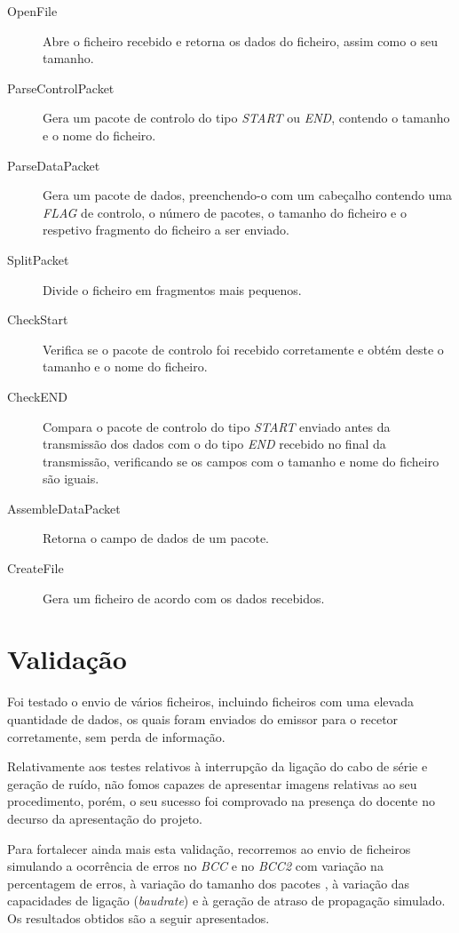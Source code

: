 \documentclass[11pt]{article}
\begin{document}
\begin{description}
	\item[OpenFile] Abre o ficheiro recebido e retorna os dados do ficheiro, assim como o seu tamanho.
	\item[ParseControlPacket] Gera um pacote de controlo do tipo \textit{START} ou \textit{END}, contendo o tamanho e o nome do ficheiro.
	\item[ParseDataPacket] Gera um pacote de dados, preenchendo-o com um cabeçalho contendo uma \textit{FLAG} de controlo, o número de pacotes, o tamanho do ficheiro e o respetivo fragmento do ficheiro a ser enviado.
	\item[SplitPacket] Divide o ficheiro em fragmentos mais pequenos.
	\item[CheckStart] Verifica se o pacote de controlo foi recebido corretamente e obtém deste o tamanho e o nome do ficheiro.
	\item[CheckEND] Compara o pacote de controlo do tipo \textit{START} enviado antes da transmissão dos dados com o do tipo \textit{END} recebido no final da transmissão, verificando se os campos com o tamanho e nome do ficheiro são iguais.
	\item[AssembleDataPacket] Retorna o campo de dados de um pacote.
	\item[CreateFile] Gera um ficheiro de acordo com os dados recebidos.
\end{description}


\section{Validação}

Foi testado o envio de vários ficheiros, incluindo ficheiros com uma elevada quantidade de dados, os quais foram enviados do emissor para o recetor corretamente, sem perda de informação.

Relativamente aos testes relativos à interrupção da ligação do cabo de série e geração de ruído, não fomos capazes de apresentar imagens relativas ao seu procedimento, porém, o seu sucesso foi comprovado na presença do docente no decurso da apresentação do projeto.

Para fortalecer ainda mais esta validação, recorremos ao envio de ficheiros simulando a ocorrência de erros no \textit{BCC} e no \textit{BCC2} com variação na percentagem de erros, à variação do tamanho dos pacotes , à variação das capacidades de ligação (\textit{baudrate}) e à geração de atraso de propagação simulado. Os resultados obtidos são a seguir apresentados.  
\end{document}
